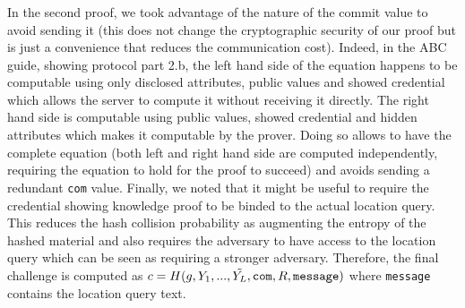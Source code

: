 \documentclass[10pt,conference,compsocconf]{IEEEtran}
\begin{document}
\subsubsection{} In the second proof, we took advantage of the nature of the commit value to avoid sending it (this does not change the cryptographic security of our proof but is just a convenience that reduces the communication cost). Indeed, in the ABC guide, showing protocol part 2.b, the left hand side of the equation happens to be computable using only disclosed attributes, public values and showed credential which allows the server to compute it without receiving it directly. The right hand side is computable using public values, showed credential and hidden attributes which makes it computable by the prover. Doing so allows to have the complete equation (both left and right hand side are computed independently, requiring the equation to hold for the proof to succeed) and avoids sending a redundant \texttt{com} value. Finally, we noted that it might be useful to require the credential showing knowledge proof to be binded to the actual location query. This reduces the hash collision probability as augmenting the entropy of the hashed material and also requires the adversary to have access to the location query which can be seen as requiring a stronger adversary. Therefore, the final challenge is computed as $c=H(g,Y_1,...,\Tilde{Y_L},\texttt{com},R,\texttt{message})$ where \texttt{message} contains the location query text.
\end{document}

